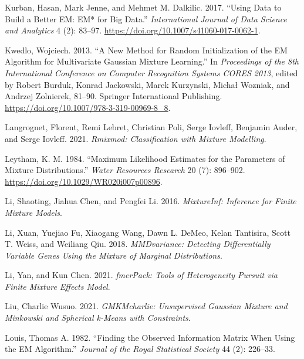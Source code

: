 \begin{CSLReferences}{1}{0}
\leavevmode{}%
Kurban, Hasan, Mark Jenne, and Mehmet M. Dalkilic. 2017. {``Using Data to Build a Better {EM}: {EM}* for Big Data.''} \emph{International Journal of Data Science and Analytics} 4 (2): 83--97. \url{https://doi.org/10.1007/s41060-017-0062-1}.

\leavevmode{}%
Kwedlo, Wojciech. 2013. {``A {New Method} for {Random Initialization} of the {EM Algorithm} for {Multivariate Gaussian Mixture Learning}.''} In \emph{Proceedings of the {8th International Conference} on {Computer Recognition Systems CORES 2013}}, edited by Robert Burduk, Konrad Jackowski, Marek Kurzynski, Michał Wozniak, and Andrzej Zolnierek, 81--90. {Springer International Publishing}. \url{https://doi.org/10.1007/978-3-319-00969-8_8}.

\leavevmode{}%
Langrognet, Florent, Remi Lebret, Christian Poli, Serge Iovleff, Benjamin Auder, and Serge Iovleff. 2021. \emph{Rmixmod: Classification with Mixture Modelling}.

\leavevmode{}%
Leytham, K. M. 1984. {``Maximum {Likelihood Estimates} for the {Parameters} of {Mixture Distributions}.''} \emph{Water Resources Research} 20 (7): 896--902. \url{https://doi.org/10.1029/WR020i007p00896}.

\leavevmode{}%
Li, Shaoting, Jiahua Chen, and Pengfei Li. 2016. \emph{MixtureInf: Inference for Finite Mixture Models}.

\leavevmode{}%
Li, Xuan, Yuejiao Fu, Xiaogang Wang, Dawn L. DeMeo, Kelan Tantisira, Scott T. Weiss, and Weiliang Qiu. 2018. \emph{MMDvariance: Detecting Differentially Variable Genes Using the Mixture of Marginal Distributions}.

\leavevmode{}%
Li, Yan, and Kun Chen. 2021. \emph{fmerPack: Tools of Heterogeneity Pursuit via Finite Mixture Effects Model}.

\leavevmode{}%
Liu, Charlie Wusuo. 2021. \emph{GMKMcharlie: Unsupervised Gaussian Mixture and Minkowski and Spherical k-Means with Constraints}.

\leavevmode{}%
Louis, Thomas A. 1982. {``Finding the {Observed Information Matrix} When {Using} the {EM Algorithm}.''} \emph{Journal of the Royal Statistical Society} 44 (2): 226--33.


\end{CSLReferences}
